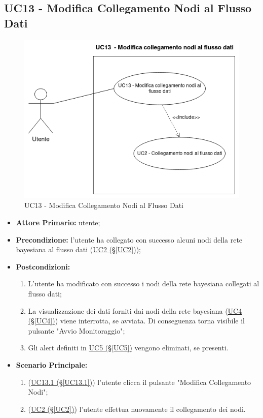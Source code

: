 \pagebreak

\subsection{UC13 - Modifica Collegamento Nodi al Flusso Dati}\label{UC13}

\begin{figure}[H]
\centering
\includegraphics[scale=0.6]{./images/UC13.png}
\caption{UC13 - Modifica Collegamento Nodi al Flusso Dati}
\end{figure}


\begin{itemize}
\item \textbf{Attore Primario:} utente;
\item \textbf{Precondizione:} l'utente ha collegato con successo alcuni nodi della rete bayesiana al flusso dati (\hyperref[UC2]{UC2 (§\ref*{UC2})});
\item \textbf{Postcondizioni:} 
	\begin{enumerate}
	\item L'utente ha modificato con successo i nodi della rete bayesiana collegati al flusso dati;
	\item La visualizzazione dei dati forniti dai nodi della rete bayesiana (\hyperref[UC4]{UC4 (§\ref*{UC4})}) viene interrotta, se avviata. Di conseguenza torna visibile il pulsante "Avvio Monitoraggio";
	\item Gli alert definiti in \hyperref[UC5]{UC5 (§\ref*{UC5})} vengono eliminati, se presenti.
	\end{enumerate}
\item \textbf{Scenario Principale:}
	\begin{enumerate}
	\item (\hyperref[UC13.1]{UC13.1 (§\ref*{UC13.1})}) l'utente clicca il pulsante "Modifica Collegamento Nodi";
	\item (\hyperref[UC2]{UC2 (§\ref*{UC2})}) l'utente effettua nuovamente il collegamento dei nodi.
	\end{enumerate}
\end{itemize}

